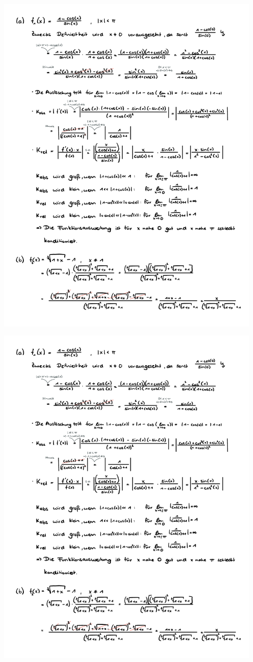 \documentclass[a4paper,oneside,11pt]{scrartcl}
\begin{document}
\begin{minipage}[t]{\textwidth}
\includegraphics[scale = 0.75, page=4]{AlMa_blatt03.pdf}
\end{minipage}
\pagebreak
\begin{minipage}[t]{\textwidth}
\includegraphics[scale = 0.75, page=5]{AlMa_blatt03.pdf}
\end{minipage}
\end{document}
